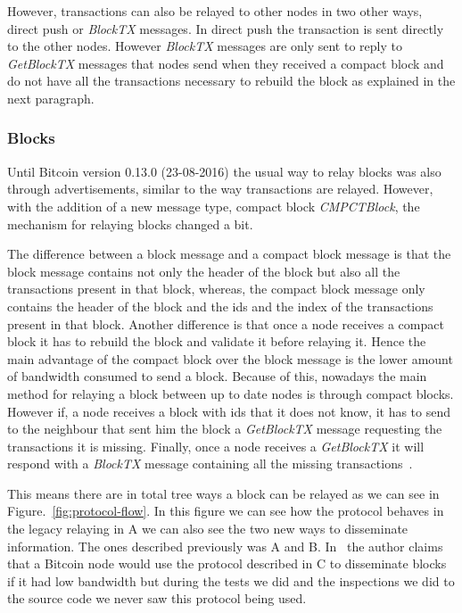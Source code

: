 However, transactions can also be relayed to other nodes in two other ways, direct push or \textsl{BlockTX} messages. In direct push the transaction is sent directly to the other nodes. However \textsl{BlockTX} messages are only sent to reply to \textsl{GetBlockTX} messages that nodes send when they received a compact block and do not have all the transactions necessary to rebuild the block as explained in the next paragraph.

\subsubsection{Blocks}
Until Bitcoin version 0.13.0 (23-08-2016) the usual way to relay blocks was also through advertisements, similar to the way transactions are relayed. However, with the addition of a new message type, compact block \textsl{CMPCTBlock}, the mechanism for relaying blocks changed a bit.

The difference between a block message and a compact block message is that the block message contains not only the header of the block but also all the transactions present in that block, whereas, the compact block message only contains the header of the block and the ids and the index of the transactions present in that block. Another difference is that once a node receives a compact block it has to rebuild the block and validate it before relaying it. Hence the main advantage of the compact block over the block message is the lower amount of bandwidth consumed to send a block. Because of this, nowadays the main method for relaying a block between up to date nodes is through compact blocks. However if, a node receives a block with ids that it does not know, it has to send to the neighbour that sent him the block a \textit{GetBlockTX} message requesting the transactions it is missing. Finally, once a node receives a \textit{GetBlockTX} it will respond with a  \textit{BlockTX} message containing all the missing transactions~\cite{bip152}.

This means there are in total tree ways a block can be relayed as we can see in Figure.~\ref{fig:protocol-flow}. In this figure we can see how the protocol behaves in the legacy relaying in A we can also see the two new ways to disseminate information. The ones described previously was A and B. In~\cite{bip152} the author claims that a Bitcoin node would use the protocol described in C to disseminate blocks if it had low bandwidth but during the tests we did and the inspections we did to the source code we never saw this protocol being used.

